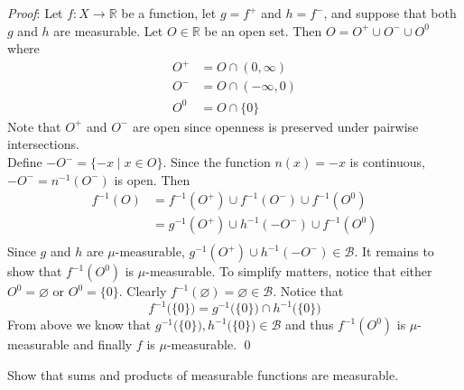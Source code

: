 \documentclass[12pt]{article}
\let\emptyset\varnothing
\renewenvironment{proof}{\hspace{-4 ex} \emph{Proof}:}{\qed}
\newcommand{\RR}{\mathbb{R}}
\newcommand{\BB}{\mathcal{B}}
\begin{document}
\begin{proof}
	Let $f: X \to \RR$ be a function, let $g = f^+$ and $h= f^-$, and suppose that both $g$ and $h$ are measurable. Let $O \in \RR$ be an open set. Then $O = O^+ \cup O^- \cup O^0$ where
	\begin{align*}
		O^+ & = O \cap (0,\infty) \\
		O^- & = O \cap (-\infty, 0) \\
		O^0 & = O \cap \{0\}
	\end{align*}
	Note that $O^+$ and $O^-$ are open since openness is preserved under pairwise intersections.\\
	Define $-O^- = \{-x \mid x\in O\}$. Since the function $n(x) = -x$ is continuous, $-O^- = n^{-1}(O^-)$ is open. Then
	\begin{align*}
		f^{-1}(O) & = f^{-1}(O^+) \cup f^{-1}(O^-) \cup f^{-1}(O^0) \\
		& = g^{-1}(O^+) \cup h^{-1}(-O^-) \cup f^{-1}(O^0) \\
	\end{align*}
	Since $g$ and $h$ are $\mu$-measurable, $g^{-1}(O^+) \cup h^{-1}(-O^-) \in \BB$. It remains to show that $f^{-1}(O^0)$ is $\mu$-measurable. To simplify matters, notice that either $O^0 = \emptyset$ or $O^0 = \{0\}$. Clearly $f^{-1}(\emptyset) = \emptyset \in \BB$. Notice that 
	$$
	f^{-1}\big ( \{0\} \big ) = g^{-1}\big ( \{0\} \big ) \cap h^{-1}\big ( \{0\} \big )
	$$
	From above we know that $g^{-1}\big ( \{0\} \big ), h^{-1}\big ( \{0\} \big ) \in \BB$ and thus $f^{-1}(O^0)$ is $\mu$-measurable and finally $f$ is $\mu$-measurable.	
\end{proof}

\bigbreak

Show that sums and products of measurable functions are measurable. \bigbreak
\end{document}
